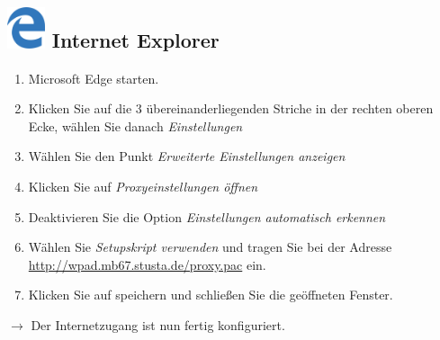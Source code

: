 \documentclass[a4paper,12pt]{scrartcl}
\begin{document}
\subsection*{\includegraphics[height=1.2cm,keepaspectratio]{Bilder/Mcrosoft_Edge_logo} Internet Explorer}
\begin{enumerate}
    \item Microsoft Edge starten.
    \item Klicken Sie auf die 3 übereinanderliegenden Striche in der rechten oberen Ecke, wählen Sie danach \emph{Einstellungen}
    \item Wählen Sie den Punkt \emph{Erweiterte Einstellungen anzeigen}
	\item Klicken Sie auf \emph{Proxyeinstellungen öffnen}
	\item Deaktivieren Sie die Option \emph{Einstellungen automatisch erkennen}
	\item Wählen Sie \emph{Setupskript verwenden} und tragen Sie bei der Adresse \\ \url{http://wpad.mb67.stusta.de/proxy.pac} ein.
	\item Klicken Sie auf speichern und schließen Sie die geöffneten 
			Fenster.
\end{enumerate}
$\rightarrow$ Der Internetzugang ist nun fertig konfiguriert.

%
\end{document}
